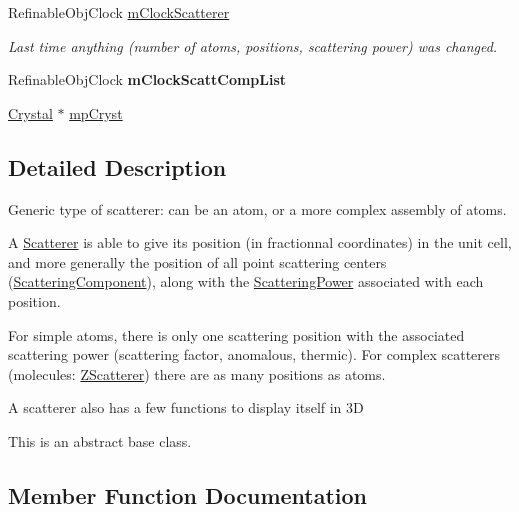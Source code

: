 \begin{DoxyCompactItemize}
\mbox{\label{class_obj_cryst_1_1_scatterer_ace0238cbbd28dd0adb9e6102bc2b8cae}} 
Refinable\+Obj\+Clock \mbox{\hyperlink{class_obj_cryst_1_1_scatterer_ace0238cbbd28dd0adb9e6102bc2b8cae}{m\+Clock\+Scatterer}}
\begin{DoxyCompactList}\small\item\em Last time anything (number of atoms, positions, scattering power) was changed. \end{DoxyCompactList}\item 
\mbox{\label{class_obj_cryst_1_1_scatterer_a807f373561fbd1c460b0dfc40924e542}} 
Refinable\+Obj\+Clock {\bfseries m\+Clock\+Scatt\+Comp\+List}
\item 
\mbox{\hyperlink{class_obj_cryst_1_1_crystal}{Crystal}} $\ast$ \mbox{\hyperlink{class_obj_cryst_1_1_scatterer_a359e6115a710c44bf340f439a17cb073}{mp\+Cryst}}
\end{DoxyCompactItemize}


\subsection{Detailed Description}
Generic type of scatterer\+: can be an atom, or a more complex assembly of atoms. 

A \mbox{\hyperlink{class_obj_cryst_1_1_scatterer}{Scatterer}} is able to give its position (in fractionnal coordinates) in the unit cell, and more generally the position of all point scattering centers (\mbox{\hyperlink{struct_obj_cryst_1_1_scattering_component}{Scattering\+Component}}), along with the \mbox{\hyperlink{class_obj_cryst_1_1_scattering_power}{Scattering\+Power}} associated with each position.

For simple atoms, there is only one scattering position with the associated scattering power (scattering factor, anomalous, thermic). For complex scatterers (molecules\+: \mbox{\hyperlink{class_obj_cryst_1_1_z_scatterer}{Z\+Scatterer}}) there are as many positions as atoms.

A scatterer also has a few functions to display itself in 3D

This is an abstract base class. 

\subsection{Member Function Documentation}
\mbox{\label{class_obj_cryst_1_1_scatterer_ac0d7457431eacb14d31bee72c6f0af7a}} 
